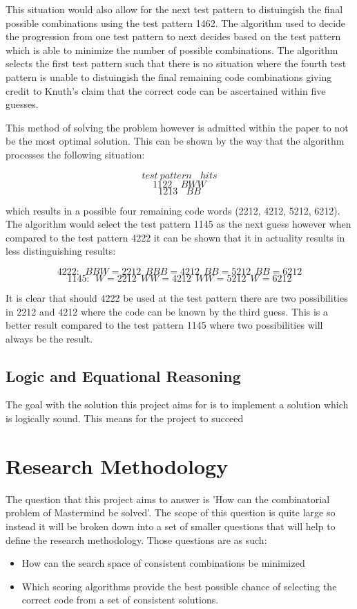 \documentclass[12pt]{article}  %
\theoremstyle{definition}
\theoremstyle{remark}
\begin{document}
This situation would also allow for the next test pattern to distuingish the final possible combinations using the test pattern 1462. The algorithm used to decide the progression from one test pattern to next decides based on the test pattern which is able to minimize the number of possible combinations. The algorithm selects the first test pattern such that there is no situation where the fourth test pattern is unable to distuingish the final remaining code combinations giving credit to Knuth's claim that the correct code can be ascertained within five guesses.

This method of solving the problem however is admitted within the paper to not be the most optimal solution. This can be shown by the way that the algorithm processes the following situation:

\[ test \ pattern \ \ \ \  hits\]
\[ 1122 \ \ \ \ BWW\]
\[ 1213 \ \ \ \ BB\]

which results in a possible four remaining code words (2212, 4212, 5212, 6212). The algorithm would select the test pattern 1145 as the next guess however when compared to the test pattern 4222 it can be shown that it in actuality results in less distinguishing results:

\[ 4222: \ \ BBW = 2212 \ \ BBB = 4212 \ \ BB = 5212 \ \ BB = 6212 \]
\[ 1145: \ \ W = 2212 \ \ WW = 4212 \ \ WW = 5212 \ \ W = 6212 \]

It is clear that should 4222 be used at the test pattern there are two possibilities in 2212 and 4212 where the code can be known by the third guess. This is a better result compared to the test pattern 1145 where two possibilities will always be the result.


\subsection {Logic and Equational Reasoning}
The goal with the solution this project aims for is to implement a solution which is logically sound. This means for the project to succeed


\newpage                     %
\section{Research Methodology}\label{ss:back}

The question that this project aims to answer is 'How can the combinatorial problem of Mastermind be solved'. The scope of this question is quite large so instead it will be broken down into a set of smaller questions that will help to define the research methodology. Those questions are as such:
\begin {itemize}
	\item {How can the search space of consistent combinations be minimized}
	\item {Which scoring algorithms provide the best possible chance of selecting the correct code from a set of consistent solutions.}
\end {itemize}
\end{document}
